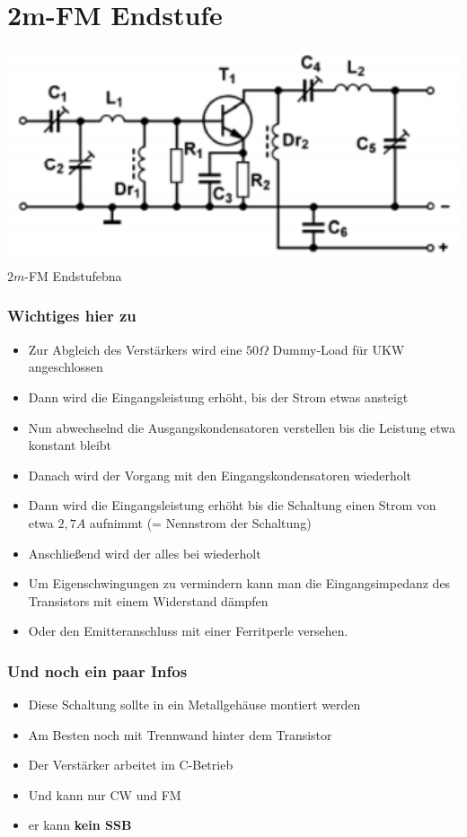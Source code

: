 \section*{2m-FM Endstufe}
\begin{frame}
    \begin{center}
        \includegraphics[width=1\textwidth]{a17/TG311.png}\\
       $2m$-FM Endstufe{bna}
    \end{center}
\end{frame}
\begin{frame}
\frametitle{Wichtiges hier zu}
\begin{itemize}
	\item	Zur Abgleich des Verstärkers wird eine $50 \Omega$ Dummy-Load für UKW angeschlossen
	\item	Dann wird die Eingangsleistung erhöht, bis der Strom etwas ansteigt
	\item	Nun abwechselnd die Ausgangskondensatoren verstellen bis die Leistung etwa konstant bleibt
	\item	Danach wird der Vorgang mit den Eingangskondensatoren wiederholt
	\item	Dann wird die Eingangsleistung erhöht bis die Schaltung einen Strom von etwa $2,7 A$ aufnimmt (= Nennstrom der Schaltung)
	\item	Anschließend wird der alles bei wiederholt
	\item	Um Eigenschwingungen zu vermindern kann man die Eingangsimpedanz des Transistors  mit einem Widerstand dämpfen
	\item	Oder den Emitteranschluss mit einer Ferritperle versehen.
\end{itemize}
\end{frame}

\begin{frame}
\frametitle{Und noch ein paar Infos}
\begin{itemize}
	\item	Diese Schaltung sollte in ein Metallgehäuse montiert werden
	\item	Am Besten noch mit Trennwand hinter dem Transistor
	\item	Der Verstärker arbeitet im C-Betrieb
	\item	Und kann nur CW und FM
	\item	er kann \textbf{kein SSB} 
\end{itemize}
\end{frame}

